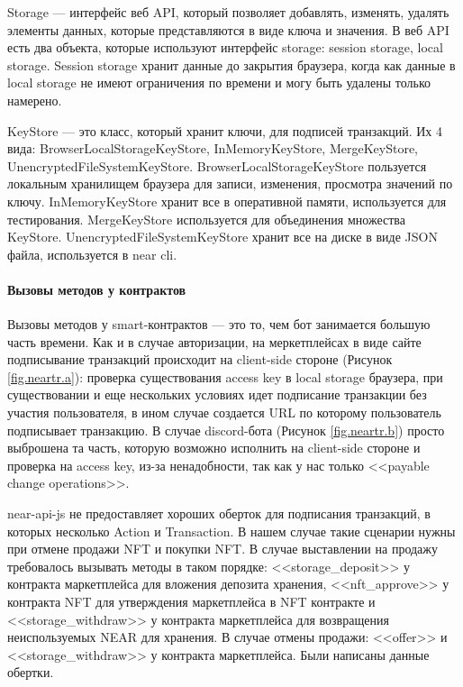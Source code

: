 \begin{definition}
    Storage --- интерфейс веб API, который позволяет добавлять, изменять, удалять элементы данных, которые представляются в виде ключа и значения\cite{webapistorage}. В веб API есть два объекта, которые используют интерфейс storage: session storage, local storage\cite{webapilocalstorage}. Session storage хранит данные до закрытия браузера, когда как данные в local storage не имеют ограничения по времени и могу быть удалены только намерено.
\end{definition}

\begin{definition}
    KeyStore\cite{nearclasskeystore} --- это класс, который хранит ключи, для подписей транзакций. Их 4 вида: BrowserLocalStorageKeyStore, InMemoryKeyStore, MergeKeyStore, UnencryptedFileSystemKeyStore. BrowserLocalStorageKeyStore пользуется локальным хранилищем браузера для записи, изменения, просмотра значений по ключу. InMemoryKeyStore хранит все в оперативной памяти, используется для тестирования. MergeKeyStore используется для объединения множества KeyStore. UnencryptedFileSystemKeyStore хранит все на диске в виде JSON файла, используется в near cli\cite{nearcli}.
\end{definition}

\paragraph{Вызовы методов у контрактов}

Вызовы методов у smart-контрактов --- это то, чем бот занимается большую часть времени. Как и в случае авторизации, на меркетплейсах в виде сайте подписывание транзакций происходит на client-side стороне (Рисунок {\color{blue} \ref{fig.neartr.a}}): проверка существования access key в local storage браузера, при существовании и еще нескольких условиях идет подписание транзакции без участия пользователя, в ином случае создается URL по которому пользователь подписывает транзакцию. В случае discord-бота (Рисунок {\color{blue} \ref{fig.neartr.b}}) просто выброшена та часть, которую возможно исполнить на client-side стороне и проверка на access key, из-за ненадобности, так как у нас только <<payable change operations>>.

near-api-js не предоставляет хороших оберток для подписания транзакций, в которых несколько Action и Transaction. В нашем случае такие сценарии нужны при отмене продажи NFT и покупки NFT. В случае выставлении на продажу требовалось вызывать методы в таком порядке: <<storage\_deposit>> у контракта маркетплейса для вложения депозита хранения, <<nft\_approve>> у контракта NFT для утверждения маркетплейса в NFT контракте и <<storage\_withdraw>> у контракта маркетплейса для возвращения неиспользуемых NEAR для хранения. В случае отмены продажи: <<offer>> и <<storage\_withdraw>> у контракта маркетплейса. Были написаны данные обертки.


